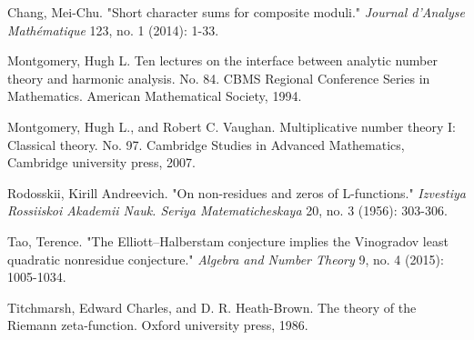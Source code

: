 \documentclass[letter,12pt]{article}
\newcounter{conj}
\theoremstyle{plain}
\theoremstyle{definition}
\theoremstyle{plain}
\begin{document}
\begin{thebibliography}{}
 Chang, Mei-Chu. "Short character sums for composite moduli." \textit{Journal d'Analyse Mathématique} 123, no. 1 (2014): 1-33.

 Montgomery, Hugh L. Ten lectures on the interface between analytic number theory and harmonic analysis. No. 84. CBMS Regional Conference Series in Mathematics. American Mathematical Society, 1994.

 Montgomery, Hugh L., and Robert C. Vaughan. Multiplicative number theory I: Classical theory. No. 97. Cambridge Studies in Advanced Mathematics, Cambridge university press, 2007.


 Rodosskii, Kirill Andreevich. "On non-residues and zeros of L-functions." \textit{Izvestiya Rossiiskoi Akademii Nauk. Seriya Matematicheskaya} 20, no. 3 (1956): 303-306. 

 Tao, Terence. "The Elliott–Halberstam conjecture implies the Vinogradov least quadratic nonresidue conjecture." \textit{Algebra and Number Theory} 9, no. 4 (2015): 1005-1034.


Titchmarsh, Edward Charles, and D. R. Heath-Brown. The theory of the Riemann zeta-function. Oxford university press, 1986.

\end{thebibliography}
\end{document}

